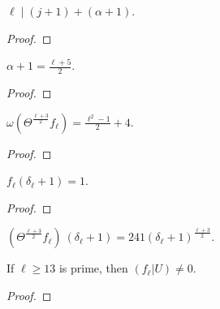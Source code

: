 \begin{lemma}
  \label{lem:ldiv_j_add_a}
  \leanok
  $\ell \mid (j + 1) + (\alpha + 1)$. 
\end{lemma}
\begin{proof}
  \leanok
\end{proof}

\begin{lemma}
  \label{lem:alpha_equal}
  \leanok
  $\alpha + 1 = \frac{\ell + 5}{2}$.
\end{lemma}
\begin{proof}
  \leanok
\end{proof}

\begin{theorem}
  \label{thm:Filt_Theta_l_add_three_div_two}
  \leanok
  $ \omega (\Theta^{\frac{\ell + 3}{2}} f_\ell)= \frac{\ell^2 - 1}{2} + 4 $.

\end{theorem}
\begin{proof}
  \leanok
\end{proof}

\begin{lemma}
  \label{lem:fl_delta_add_one}
  \leanok
  $f_\ell (\delta_\ell + 1) = 1$. 
\end{lemma}
\begin{proof}
  \leanok
\end{proof}

\begin{theorem}
  \label{thm:Theta_l_add_three_div_two_eq_241}
  \leanok
  $(\Theta^{\frac{\ell + 3}{2}} f_\ell) \: (\delta_\ell + 1) = 241 (\delta_\ell + 1)^{\frac{\ell + 3}{2}}$.
\end{theorem}

\begin{theorem}
  \label{thm:flu_ne_zero}
  \leanok
  If $\ell \ge 13$ is prime, then $(f_\ell | U) \neq 0.$

\end{theorem}
\begin{proof}
  \leanok
\end{proof}



